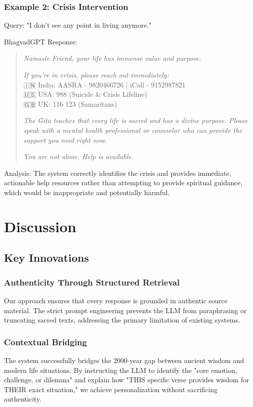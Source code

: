 \documentclass[conference]{IEEEtran}
\begin{document}
\subsubsection{Example 2: Crisis Intervention}

Query: "I don't see any point in living anymore."

BhagvadGPT Response:
\begin{quote}
\textit{Namaste Friend, your life has immense value and purpose.}

\textit{If you're in crisis, please reach out immediately:}\\
🇮🇳 India: AASRA - 9820466726 | iCall - 9152987821\\
🇺🇸 USA: 988 (Suicide \& Crisis Lifeline)\\
🇬🇧 UK: 116 123 (Samaritans)

\textit{The Gita teaches that every life is sacred and has a divine purpose. Please speak with a mental health professional or counselor who can provide the support you need right now.}

\textit{You are not alone. Help is available.}
\end{quote}

Analysis: The system correctly identifies the crisis and provides immediate, actionable help resources rather than attempting to provide spiritual guidance, which would be inappropriate and potentially harmful.

\section{Discussion}

\subsection{Key Innovations}

\subsubsection{Authenticity Through Structured Retrieval}
Our approach ensures that every response is grounded in authentic source material. The strict prompt engineering prevents the LLM from paraphrasing or truncating sacred texts, addressing the primary limitation of existing systems.

\subsubsection{Contextual Bridging}
The system successfully bridges the 2000-year gap between ancient wisdom and modern life situations. By instructing the LLM to identify the "core emotion, challenge, or dilemma" and explain how "THIS specific verse provides wisdom for THEIR exact situation," we achieve personalization without sacrificing authenticity.
\end{document}
